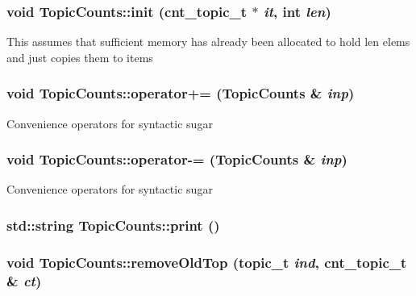 \label{struct_topic_counts_a1b625b3b8e01723b1cd79ac436b50b3e}
\hypertarget{struct_topic_counts_aa2c279222d93b6e5329b16744fdb2218}{
\subsubsection[{init}]{\setlength{\rightskip}{0pt plus 5cm}void TopicCounts::init (cnt\_\-topic\_\-t $\ast$ {\em it}, \/  int {\em len})}}
\label{struct_topic_counts_aa2c279222d93b6e5329b16744fdb2218}
This assumes that sufficient memory has already been allocated to hold len elems and just copies them to items \hypertarget{struct_topic_counts_af65a213b5195d6c2ba547e28e3727b91}{
\subsubsection[{operator+=}]{\setlength{\rightskip}{0pt plus 5cm}void TopicCounts::operator+= ({\bf TopicCounts} \& {\em inp})}}
\label{struct_topic_counts_af65a213b5195d6c2ba547e28e3727b91}
Convenience operators for syntactic sugar \hypertarget{struct_topic_counts_a1317117ae2bff6188196ffec46f23dc5}{
\subsubsection[{operator-\/=}]{\setlength{\rightskip}{0pt plus 5cm}void TopicCounts::operator-\/= ({\bf TopicCounts} \& {\em inp})}}
\label{struct_topic_counts_a1317117ae2bff6188196ffec46f23dc5}
Convenience operators for syntactic sugar \hypertarget{struct_topic_counts_ae8b91f5e30f6cc071f31db43f39e66e9}{
\subsubsection[{print}]{\setlength{\rightskip}{0pt plus 5cm}std::string TopicCounts::print ()}}
\label{struct_topic_counts_ae8b91f5e30f6cc071f31db43f39e66e9}
\hypertarget{struct_topic_counts_a623d6cd7178f596cffee5047ccb95d49}{
\subsubsection[{removeOldTop}]{\setlength{\rightskip}{0pt plus 5cm}void TopicCounts::removeOldTop (topic\_\-t {\em ind}, \/  cnt\_\-topic\_\-t \& {\em ct})}}
